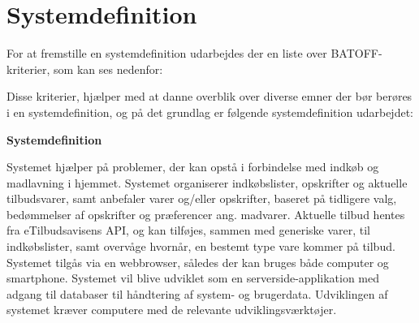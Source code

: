 \chapter{Systemdefinition}

For at fremstille en systemdefinition udarbejdes der en liste over BATOFF-kriterier\citep{OOA&D2001}, som kan ses nedenfor:



Disse kriterier, hjælper med at danne overblik over diverse emner der bør berøres i en systemdefinition, og på det grundlag er følgende systemdefinition udarbejdet:

\textbf{Systemdefinition}

Systemet hjælper på problemer, der kan opstå i forbindelse med indkøb og madlavning i hjemmet. 
Systemet organiserer indkøbslister, opskrifter og aktuelle tilbudsvarer, samt anbefaler varer og/eller opskrifter, baseret på tidligere valg, bedømmelser af opskrifter og præferencer ang. madvarer. 
Aktuelle tilbud hentes fra eTilbudsavisens API, og kan tilføjes, sammen med generiske varer, til indkøbslister, samt overvåge hvornår, en bestemt type vare kommer på tilbud.
Systemet tilgås via en webbrowser, således der kan bruges både computer og smartphone. 
Systemet vil blive udviklet som en serverside-applikation med adgang til databaser til håndtering af system- og brugerdata. 
Udviklingen af systemet kræver computere med de relevante udviklingsværktøjer. 